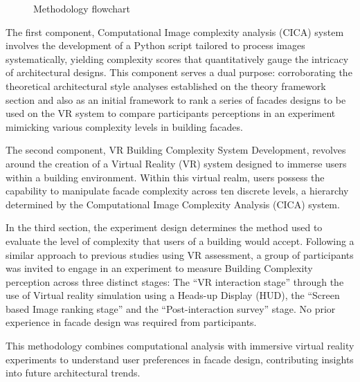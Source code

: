\begin{figure}[!htb]
      \caption{Methodology flowchart}
      \label{fig:MethodologyFlowchart}
    \end{figure}

The first component, Computational Image complexity analysis (CICA) system involves the development of a Python script tailored to process images systematically, yielding complexity scores that quantitatively gauge the intricacy of architectural designs.
This component serves a dual purpose: corroborating the theoretical architectural style analyses established on the theory framework section and also as an initial framework to rank a series of facades designs to be used on the VR system to compare participants perceptions in an experiment mimicking various complexity levels in building facades.

The second component, VR Building Complexity System Development, revolves around the creation of a Virtual Reality (VR) system designed to immerse users within a building environment.
Within this virtual realm, users possess the capability to manipulate facade complexity across ten discrete levels, a hierarchy determined by the Computational Image Complexity Analysis (CICA) system.

In the third section, the experiment design determines the method used to evaluate the level of complexity that users of a building would accept.
Following a similar approach to previous studies using VR assessment\cite{Wolfartsberger2019}, a group of participants was invited to engage in an experiment to measure Building Complexity perception across three distinct stages: The ``VR interaction stage'' through the use of Virtual reality simulation using a Heads-up Display (HUD), the ``Screen based Image ranking stage'' and the ``Post-interaction survey'' stage.
No prior experience in facade design was required from participants.

This methodology combines computational analysis with immersive virtual reality experiments to understand user preferences in facade design, contributing insights into future architectural trends.


